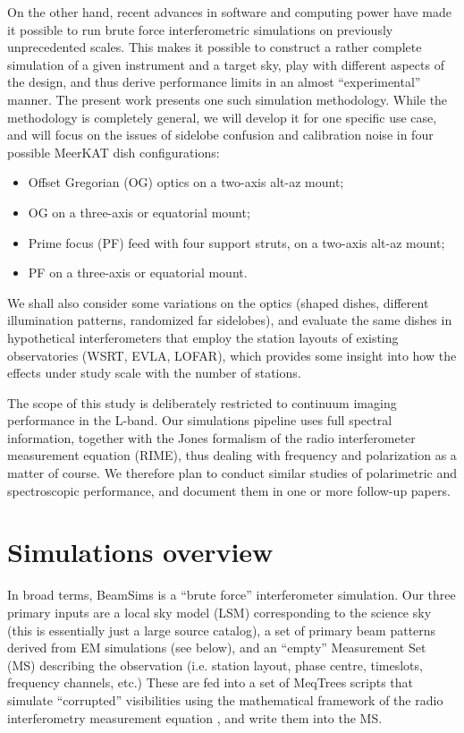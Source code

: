 \documentclass{aa}
\begin{document}
On the other hand, recent advances in software and computing power have made it possible to run brute force interferometric simulations on previously unprecedented scales. This makes it possible to construct a rather complete simulation of a given instrument and a target sky, play with different aspects of the design, and thus derive performance limits in an almost ``experimental'' manner. The present work presents one such simulation methodology. While the methodology is completely general, we will develop it for one specific use case, and will focus on the issues of sidelobe confusion and calibration noise in four possible MeerKAT dish configurations:

\begin{itemize}
  \item Offset Gregorian (OG) optics on a two-axis alt-az mount;
  \item OG on a three-axis or equatorial mount;
  \item Prime focus (PF) feed with four support struts, on a two-axis alt-az mount;
  \item PF on a three-axis or equatorial mount.
\end{itemize}

We shall also consider some variations on the optics (shaped dishes, different illumination patterns, randomized far sidelobes), and evaluate the same dishes in hypothetical interferometers that employ the station layouts of existing observatories (WSRT, EVLA, LOFAR), which provides some insight into how the effects under study scale with the number of stations.

The scope of this study is deliberately restricted to continuum imaging performance in the L-band. Our simulations pipeline uses full spectral information, together with the Jones formalism of the radio interferometer measurement equation (RIME), thus dealing with frequency and polarization as a matter of course. We therefore plan to conduct similar studies of polarimetric and spectroscopic performance, and document them in one or more follow-up papers.

\section{Simulations overview}

In broad terms, BeamSims is a ``brute force'' interferometer simulation. Our three primary inputs are a local sky model (LSM) corresponding to the science sky (this is essentially just a large source catalog), a set of primary beam patterns derived from EM simulations (see below), and an ``empty'' Measurement Set (MS) describing the observation (i.e. station layout, phase centre, timeslots, frequency channels, etc.) These are fed into a set of MeqTrees \citep{meqtrees} scripts that simulate ``corrupted'' visibilities using the mathematical framework of the radio interferometry measurement equation \citep[RIME; see][]{ME1,RRIME1}, and write them into the MS. 
\end{document}
